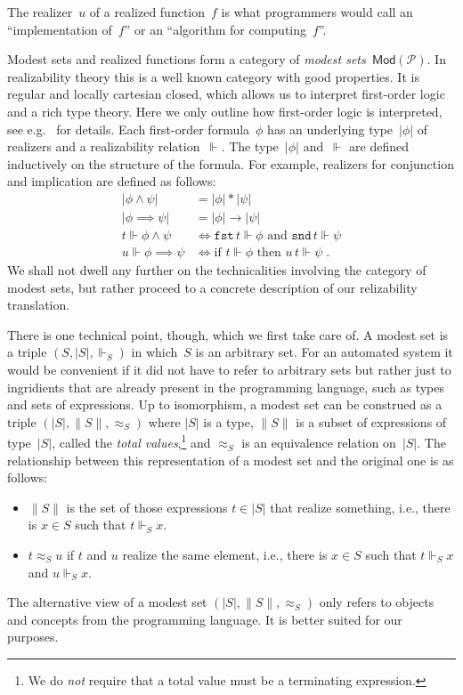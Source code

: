 \documentclass{article}
\newcommand{\ut}[1]{|#1|}
\newcommand{\tot}[1]{\|#1\|}
\newcommand{\per}[1]{\approx_{#1}}
\newcommand{\PL}{\mathcal{P}}
\newcommand{\Mod}[1]{\mathsf{Mod}(#1)}
\newcommand{\rz}{\Vdash}
\newcommand{\fst}[1]{\texttt{fst}\,#1}
\newcommand{\snd}[1]{\texttt{snd}\,#1}
\begin{document}
The realizer~$u$ of a realized function~$f$ is what programmers would
call an ``implementation of~$f$'' or an ``algorithm for
computing~$f$''.

Modest sets and realized functions form a category of \emph{modest
  sets~$\Mod{\PL}$}. In realizability theory this is a well known
category with good properties. It is regular and locally cartesian
closed, which allows us to interpret first-order logic and a rich type
theory. Here we only outline how first-order logic is interpreted, see
e.g.~\cite{Bauer:00} for details. Each first-order formula~$\phi$ has
an underlying type~$\ut{\phi}$ of realizers and a realizability
relation~$\rz$. The type~$\ut{\phi}$ and~$\rz$ are defined inductively
on the structure of the formula. For example, realizers for
conjunction and implication are defined as follows:
%
\begin{align*}
  \ut{\phi \land \psi} &= \ut{\phi} * \ut{\psi} \\
  \ut{\phi \implies \psi} &= \ut{\phi} \to \ut{\psi} \\
  t \rz \phi \land \psi &\iff \text{$\fst{t} \rz \phi$ and $\snd{t} \rz
    \psi$} \\
  u \rz \phi \implies \psi &\iff \text{if $t \rz \phi$ then $u\,t \rz
    \psi$}
  \;.
\end{align*}
%
We shall not dwell any further on the technicalities involving the
category of modest sets, but rather proceed to a concrete description
of our relizability translation.

There is one technical point, though, which we first take care of. A
modest set is a triple $(S, \ut{S}, {\rz_S})$ in which~$S$ is an
arbitrary set. For an automated system it would be convenient if it
did not have to refer to arbitrary sets but rather just to ingridients
that are already present in the programming language, such as types
and sets of expressions. Up to isomorphism, a modest set can be
construed as a triple $(\ut{S}, \tot{S}, {\per{S}})$ where
$\ut{S}$ is a type, $\tot{S}$ is a subset of expressions of
type~$\ut{S}$, called the \emph{total values},\footnote{We do
  \emph{not} require that a total value must be a terminating
  expression.} and $\per{S}$ is an equivalence relation on~$\ut{S}$.
The relationship between this representation of a modest set and the
original one is as follows:
%
\begin{itemize}
\item $\tot{S}$ is the set of those expressions $t \in \ut{S}$ that
  realize something, i.e., there is $x \in S$ such that $t \rz_S x$.
\item $t \per{S} u$ if $t$ and $u$ realize the same element, i.e.,
  there is $x \in S$ such that $t \rz_S x$ and $u \rz_S x$.
\end{itemize}
%
The alternative view of a modest set $(\ut{S}, \tot{S}, {\per{S}})$
only refers to objects and concepts from the programming language. It
is better suited for our purposes.
\end{document}
